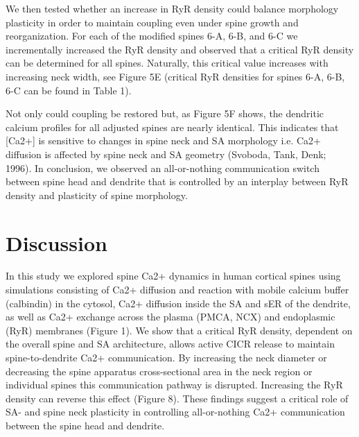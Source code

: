 \documentclass[fleqn,10pt]{wlscirep}
\begin{document}
		We then tested whether an increase in RyR density could balance morphology plasticity in order to maintain coupling even under spine growth and reorganization. For each of the modified spines 6-A, 6-B, and 6-C we incrementally increased the RyR density and observed that a critical RyR density can be determined for all spines. Naturally, this critical value increases with increasing neck width, see Figure 5E (critical RyR densities for spines 6-A, 6-B, 6-C can be found in Table 1). 
		
		Not only could coupling be restored but, as Figure 5F shows, the dendritic calcium profiles for all adjusted spines are nearly identical. This indicates that [Ca2+] is sensitive to changes in spine neck and SA morphology i.e. Ca2+ diffusion is affected by spine neck and SA geometry (Svoboda, Tank, Denk; 1996). In conclusion, we observed an all-or-nothing communication switch between spine head and dendrite that is controlled by an interplay between RyR density and plasticity of spine morphology. 


\section*{Discussion}

In this study we explored spine Ca2+ dynamics in human cortical spines using simulations consisting of Ca2+ diffusion and reaction with mobile calcium buffer (calbindin) in the cytosol, Ca2+ diffusion inside the SA and sER of the dendrite, as well as Ca2+ exchange across the plasma (PMCA, NCX) and endoplasmic (RyR) membranes (Figure 1). We show that a critical RyR density, dependent on the overall spine and SA architecture, allows active CICR release to maintain spine-to-dendrite Ca2+ communication. By increasing the neck diameter or decreasing the spine apparatus cross-sectional area in the neck region or individual spines this communication pathway is disrupted. Increasing the RyR density can reverse this effect (Figure 8). These findings suggest a critical role of SA- and spine neck plasticity in controlling all-or-nothing Ca2+ communication between the spine head and dendrite.
\end{document}
